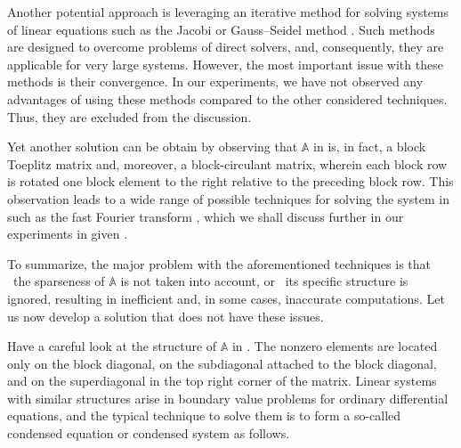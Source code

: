 Another potential approach is leveraging an iterative method for solving systems
of linear equations such as the Jacobi or Gauss--Seidel method \cite{press2007}.
Such methods are designed to overcome problems of direct solvers, and,
consequently, they are applicable for very large systems. However, the most
important issue with these methods is their convergence. In our experiments, we
have not observed any advantages of using these methods compared to the other
considered techniques. Thus, they are excluded from the discussion.

Yet another solution can be obtain by observing that $\mathbb{A}$ in
 is, in fact, a block Toeplitz matrix and, moreover, a
block-circulant matrix, wherein each block row is rotated one block element to
the right relative to the preceding block row. This observation leads to a wide
range of possible techniques for solving the system in
 such as the fast Fourier transform
\cite{mazancourt1983}, which we shall discuss further in our experiments in
given .

To summarize, the major problem with the aforementioned techniques is that
\one~the sparseness of $\mathbb{A}$ is not taken into account, or \two~its
specific structure is ignored, resulting in inefficient and, in some cases,
inaccurate computations. Let us now develop a solution that does not have these
issues.

Have a careful look at the structure of $\mathbb{A}$ in
. The nonzero elements are located only on the block
diagonal, on the subdiagonal attached to the block diagonal, and on the
superdiagonal in the top right corner of the matrix. Linear systems with similar
structures arise in boundary value problems for ordinary differential equations,
and the typical technique to solve them is to form a so-called condensed
equation or condensed system \cite{stoer2002} as follows.

